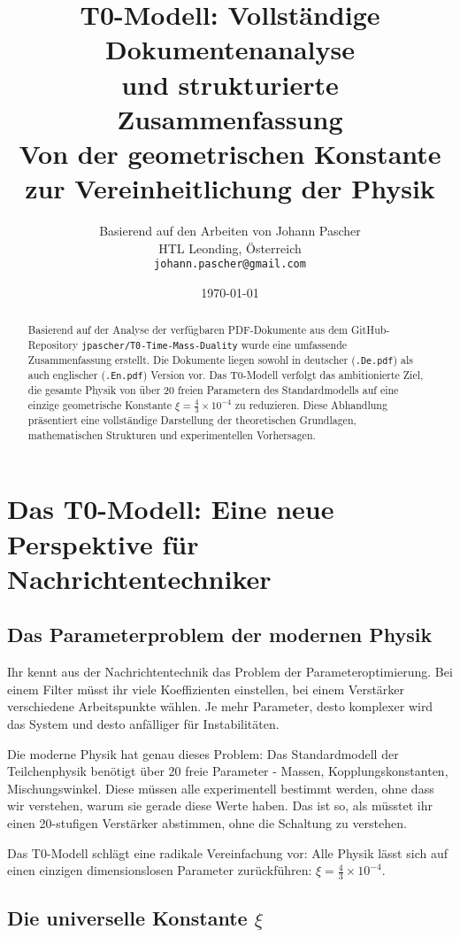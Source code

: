 \documentclass[12pt,a4paper]{article}
\title{{\Huge T0-Modell: Vollständige Dokumentenanalyse}\\
	{\LARGE und strukturierte Zusammenfassung}\\
	\vspace{1cm}
	{\Large Von der geometrischen Konstante zur Vereinheitlichung der Physik}}
\author{Basierend auf den Arbeiten von Johann Pascher\\
	HTL Leonding, Österreich\\
	\texttt{johann.pascher@gmail.com}}
\date{\today}
\newcommand{\xipar}{\xi}
\begin{document}
	
	\maketitle
	
	\begin{abstract}
		Basierend auf der Analyse der verfügbaren PDF-Dokumente aus dem GitHub-Repository \texttt{jpascher/T0-Time-Mass-Duality} wurde eine umfassende Zusammenfassung erstellt. Die Dokumente liegen sowohl in deutscher (\texttt{.De.pdf}) als auch englischer (\texttt{.En.pdf}) Version vor. Das T0-Modell verfolgt das ambitionierte Ziel, die gesamte Physik von über 20 freien Parametern des Standardmodells auf eine einzige geometrische Konstante $\xipar = \frac{4}{3} \times 10^{-4}$ zu reduzieren. Diese Abhandlung präsentiert eine vollständige Darstellung der theoretischen Grundlagen, mathematischen Strukturen und experimentellen Vorhersagen.
	\end{abstract}
	
	\tableofcontents
	\newpage
\section{Das T0-Modell: Eine neue Perspektive für Nachrichtentechniker}

\subsection{Das Parameterproblem der modernen Physik}

Ihr kennt aus der Nachrichtentechnik das Problem der Parameteroptimierung. Bei einem Filter müsst ihr viele Koeffizienten einstellen, bei einem Verstärker verschiedene Arbeitspunkte wählen. Je mehr Parameter, desto komplexer wird das System und desto anfälliger für Instabilitäten.

Die moderne Physik hat genau dieses Problem: Das Standardmodell der Teilchenphysik benötigt über 20 freie Parameter - Massen, Kopplungskonstanten, Mischungswinkel. Diese müssen alle experimentell bestimmt werden, ohne dass wir verstehen, warum sie gerade diese Werte haben. Das ist so, als müsstet ihr einen 20-stufigen Verstärker abstimmen, ohne die Schaltung zu verstehen.

Das T0-Modell schlägt eine radikale Vereinfachung vor: Alle Physik lässt sich auf einen einzigen dimensionslosen Parameter zurückführen: $\xi = \frac{4}{3} \times 10^{-4}$.

\subsection{Die universelle Konstante $\xi$}
\end{document}
